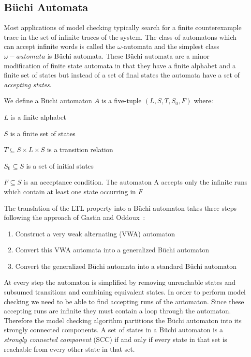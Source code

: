 \subsection{B{\"u}chi Automata}
\newcommand{\Buchi}{B{\"u}chi\xspace}
Most applications of model checking typically search for a finite counterexample trace in the set of infinite traces of the system. The class of automatons which can accept infinite words is called the $\omega$-automata and the simplest class $\omega-automata$ is \Buchi automata. These \Buchi automata are a minor modification of finite state automata in that they have a finite alphabet and a finite set of states but instead of a set of final states the automata have a set of \emph{accepting states}.
\medskip
\begin{mydef}
We define a \Buchi automaton $A$ is a five-tuple $(L, S,T,S_0, F)$ where:
\item $L$ is a finite alphabet
\item $S$ is a finite set of states
\item $T \subseteq S \times L \times S$ is a transition relation
\item $S_0 \subseteq S$ is a set of initial states 
\item $F \subseteq S$ is an acceptance condition. The automaton A accepts only the infinite runs which contain at least one state occurring in $F$
\end{mydef}

The translation of the LTL property into a \Buchi automaton takes three steps following the approach of Gastin and Oddoux~\cite{PG01}:

\begin{enumerate}
\item Construct a very weak alternating (VWA) automaton
\item Convert this VWA automata into a generalized \Buchi automaton
\item Convert the generalized \Buchi automata into a standard \Buchi automaton
\end{enumerate}

At every step the automaton is simplified by removing unreachable states and subsumed transitions and combining equivalent states. In order to perform model checking we need to be able to find accepting runs of the automaton. Since these accepting runs are infinite they must contain a loop through the automaton. Therefore the model checking algorithm partitions the \Buchi automaton into its strongly connected components. A set of states in a \Buchi automaton is a \emph{strongly connected component} (SCC) if and only if every state in that set is reachable from every other state in that set. 

